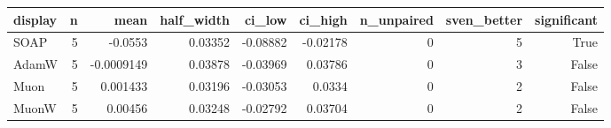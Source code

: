 \begin{tabular}{lrrrrrrrr}
\toprule
display & n & mean & half\_width & ci\_low & ci\_high & n\_unpaired & sven\_better & significant \\
\midrule
SOAP & 5 & -0.0553 & 0.03352 & -0.08882 & -0.02178 & 0 & 5 & True \\
AdamW & 5 & -0.0009149 & 0.03878 & -0.03969 & 0.03786 & 0 & 3 & False \\
Muon & 5 & 0.001433 & 0.03196 & -0.03053 & 0.0334 & 0 & 2 & False \\
MuonW & 5 & 0.00456 & 0.03248 & -0.02792 & 0.03704 & 0 & 2 & False \\
\bottomrule
\end{tabular}
